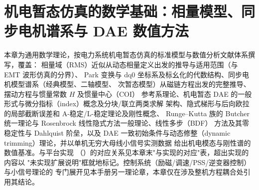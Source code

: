 
\section{机电暂态仿真的数学基础：相量模型、同步电机谱系与 DAE 数值方法}\label{sec:dy-th-mac}

\begin{theorynote}
本章为通用数学理论，按电力系统机电暂态仿真的标准模型与数值分析文献体系撰写，覆盖：
相量域（RMS）近似从动态相量定义出发的推导与适用范围（与 EMT 波形仿真的分界）、
Park 变换与 dq0 坐标系及标幺化的代数结构、同步电机模型谱系（经典模型、二轴模型、
次暂态模型）从磁链方程出发的完整推导、摆动方程与惯量常数 $H$ 及惯量中心（COI）
参考系理论、机电暂态 DAE 的一般形式与微分指标（index）概念及分块/联立两类求解
架构、隐式梯形与后向欧拉的局部截断误差和 A-稳定/L-稳定理论及刚性概念、
Runge--Kutta 族的 Butcher 统一理论与 Rosenbrock 线性隐式方法一般理论、线性多步（BDF）
方法及其零稳定性与 Dahlquist 阶垒，以及 DAE
一致初始条件与动态修整（dynamic trimming）理论，并以单机无穷大母线小信号实测数据
给出机电模态与刚性谱的数值基准。与平台实现
（）的对应关系见本章末"与实现的对应"表，超出实现的内容以
"未实现扩展说明"框就地标记。控制系统（励磁/调速/PSS/逆变器控制）与小信号理论的
专门展开见本手册另一理论章，本章仅在涉及整机方程耦合处引用其结论。
\end{theorynote}

